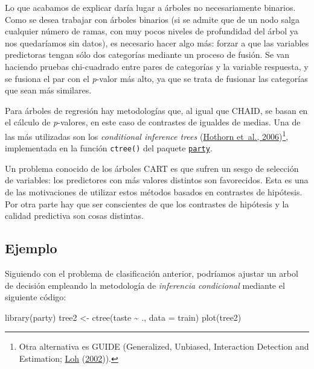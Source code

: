 \documentclass[
  spanish,
]{book}
\newenvironment{Shaded}{\begin{snugshade}}{\end{snugshade}}
\newcommand{\AttributeTok}[1]{\textcolor[rgb]{0.77,0.63,0.00}{#1}}
\newcommand{\FunctionTok}[1]{\textcolor[rgb]{0.00,0.00,0.00}{#1}}
\newcommand{\NormalTok}[1]{#1}
\newcommand{\OtherTok}[1]{\textcolor[rgb]{0.56,0.35,0.01}{#1}}
\newcommand{\SpecialCharTok}[1]{\textcolor[rgb]{0.00,0.00,0.00}{#1}}
\theoremstyle{break}
\theoremstyle{definition}
\theoremstyle{definition}
\theoremstyle{definition}
\theoremstyle{definition}
\theoremstyle{remark}
\begin{document}
Lo que acabamos de explicar daría lugar a árboles no necesariamente binarios.
Como se desea trabajar con árboles binarios (si se admite que de un nodo salga cualquier número de ramas, con muy pocos niveles de profundidad del árbol ya nos quedaríamos sin datos), es necesario hacer algo más: forzar a que las variables predictoras tengan sólo dos categorías mediante un proceso de fusión.
Se van haciendo pruebas chi-cuadrado entre pares de categorías y la variable respuesta, y se fusiona el par con el \emph{p}-valor más alto, ya que se trata de fusionar las categorías que sean más similares.

Para árboles de regresión hay metodologías que, al igual que CHAID, se basan en el cálculo de \emph{p}-valores, en este caso de contrastes de igualdes de medias.
Una de las más utilizadas son los \emph{conditional inference trees} (\protect\hyperlink{ref-hothorn2006unbiased}{Hothorn et~al., 2006})\footnote{Otra alternativa es GUIDE (Generalized, Unbiased, Interaction Detection and Estimation; \protect\hyperlink{ref-loh2002regression}{Loh} (\protect\hyperlink{ref-loh2002regression}{2002})).}, implementada en la función \texttt{ctree()} del paquete \href{https://CRAN.R-project.org/package=party}{\texttt{party}}.

Un problema conocido de los árboles CART es que sufren un sesgo de selección de variables: los predictores con más valores distintos son favorecidos.
Esta es una de las motivaciones de utilizar estos métodos basados en contrastes de hipótesis.
Por otra parte hay que ser conscientes de que los contrastes de hipótesis y la calidad predictiva son cosas distintas.

\hypertarget{ejemplo-1}{%
\subsection{Ejemplo}\label{ejemplo-1}}

Siguiendo con el problema de clasificación anterior, podríamos ajustar un arbol de decisión empleando la metodología de \emph{inferencia condicional} mediante el siguiente código:

\begin{Shaded}
\begin{Highlighting}[]
\FunctionTok{library}\NormalTok{(party)}
\NormalTok{tree2 }\OtherTok{\textless{}{-}} \FunctionTok{ctree}\NormalTok{(taste }\SpecialCharTok{\textasciitilde{}}\NormalTok{ ., }\AttributeTok{data =}\NormalTok{ train) }
\FunctionTok{plot}\NormalTok{(tree2)}
\end{Highlighting}
\end{Shaded}
\end{document}
